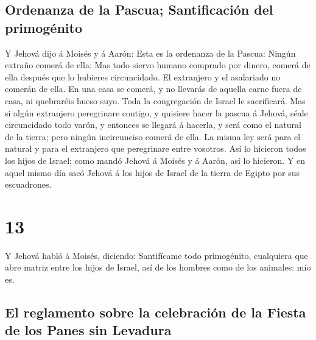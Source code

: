 \hypertarget{ordenanza-de-la-pascua-santificaciuxf3n-del-primoguxe9nito}{%
\subsection{Ordenanza de la Pascua; Santificación del
primogénito}\label{ordenanza-de-la-pascua-santificaciuxf3n-del-primoguxe9nito}}

 Y Jehová dijo á Moisés y á Aarón: Esta es la ordenanza
de la Pascua: Ningún extraño comerá de ella:  Mas todo
siervo humano comprado por dinero, comerá de ella después que lo
hubieres circuncidado.  El extranjero y el asalariado no
comerán de ella.  En una casa se comerá, y no llevarás de
aquella carne fuera de casa, ni quebraréis hueso suyo. 
Toda la congregación de Israel le sacrificará.  Mas si
algún extranjero peregrinare contigo, y quisiere hacer la pascua á
Jehová, séale circuncidado todo varón, y entonces se llegará á hacerla,
y será como el natural de la tierra; pero ningún incircunciso comerá de
ella.  La misma ley será para el natural y para el
extranjero que peregrinare entre vosotros.  Así lo
hicieron todos los hijos de Israel; como mandó Jehová á Moisés y á
Aarón, así lo hicieron.  Y en aquel mismo día sacó Jehová
á los hijos de Israel de la tierra de Egipto por sus escuadrones.

\hypertarget{section-12}{%
\section{13}\label{section-12}}

 Y Jehová habló á Moisés, diciendo: 
Santifícame todo primogénito, cualquiera que abre matriz entre los hijos
de Israel, así de los hombres como de los animales: mío es.

\hypertarget{el-reglamento-sobre-la-celebraciuxf3n-de-la-fiesta-de-los-panes-sin-levadura}{%
\subsection{El reglamento sobre la celebración de la Fiesta de los Panes
sin
Levadura}\label{el-reglamento-sobre-la-celebraciuxf3n-de-la-fiesta-de-los-panes-sin-levadura}}

